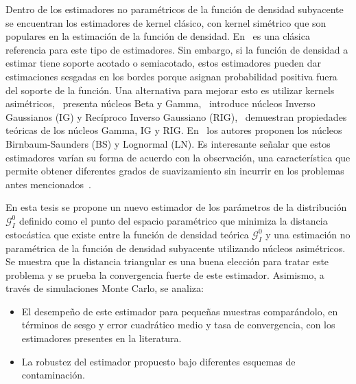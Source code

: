 Dentro de los estimadores no paramétricos de la función de densidad subyacente se encuentran los estimadores de kernel clásico, con kernel simétrico que son populares en la estimación de la función de densidad. En~\citet{Silverman1986} es una clásica referencia para este tipo de estimadores.
Sin embargo, si la función de densidad a estimar tiene soporte acotado o semiacotado, estos estimadores pueden dar estimaciones sesgadas en los bordes porque asignan probabilidad positiva fuera del soporte de la función. Una alternativa para mejorar esto es utilizar kernels asimétricos,~\citet{chen1999, chensx2000} presenta núcleos Beta y Gamma,~\citet {Scaillet2004} introduce núcleos Inverso Gaussianos (IG) y Recíproco Inverso Gaussiano (RIG),~\citet {bouezmarni2005} demuestran propiedades teóricas de los núcleos Gamma, IG y RIG. En~\citet{Jin2003} los autores proponen los núcleos Birnbaum-Saunders (BS) y Lognormal (LN). Es interesante señalar que  estos estimadores varían su forma de acuerdo con la observación, una característica que permite obtener diferentes grados de suavizamiento sin incurrir en los problemas antes mencionados~\citet{Scaillet2004}. 

En esta tesis se propone un nuevo  estimador de los parámetros de la distribución $\mathcal{G}_I^0$ definido como el punto del espacio paramétrico que minimiza la distancia estocástica que existe entre la función de densidad teórica $\mathcal{G}_I^0$ y una estimación no paramétrica de la función de densidad subyacente utilizando núcleos asimétricos. Se muestra que la distancia triangular es una buena elección para tratar este problema y se prueba la convergencia fuerte de este estimador. Asimismo, a través de simulaciones Monte Carlo, se analiza:

\begin{itemize}
	\item El desempeño de este estimador para pequeñas muestras comparándolo, en términos de sesgo y error cuadrático medio y tasa de convergencia, con los estimadores presentes en la literatura.
	\item La robustez del estimador propuesto bajo diferentes esquemas de contaminación.
\end{itemize}  

